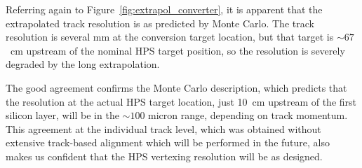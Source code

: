 
Referring again to Figure~\ref{fig:extrapol_converter}, it is apparent that the extrapolated track resolution is as predicted by Monte Carlo.
The track resolution is several mm at the conversion target location, but that target is $\sim67$~cm upstream of the nominal HPS target position, 
so the resolution is severely degraded by the long extrapolation. 

The good agreement confirms the Monte Carlo description, which predicts
that the resolution at the actual HPS target location, just 10~cm upstream of the first silicon layer, will be in the $\sim100$ micron range,
depending on track momentum. This agreement at the individual track level, which was obtained without extensive track-based alignment which will be
performed in the future, also makes us confident that the HPS vertexing resolution will be as designed.
